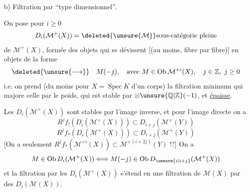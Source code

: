 b) Filtration par  ``type dimensionnel''.

On pose pour $i\geq0$
\[
D_i(\mathcal{M}^+(X))=
\deleted{\unsure{\mathcal{M}}}\text{sous-catégorie pleine}
\]
de $\mathcal{M}^+(X)$, formée des objets
qui se  dévissent [(au moins,
fibre par fibre)] en objets
de la forme
\[
\deleted{\unsure{\longrightarrow}}\quad
M(-j),\quad\text{avec }M\in\operatorname{Ob}\mathcal{M}^{+i}(X),\quad
j\in\mathbb{Z},\ j\geq0
\]
i.e. on prend (du moins pour $X=\operatorname{Spec}K$ d'un
corps) la filtration minimum qui
majore celle par le poids,  qui est
stable par $\otimes\unsure{\mathbb{Q}|\mathbb{Z}}(-1)$, et \uline{épaisse}.

Les $D_i(\mathcal{M}^+(X))$ sont stables par l'image inverse,
et pour l'image directe on a
\[
R^jf_!(D_i(\mathcal{M}^+(X)))\subset D_{i+j}(\mathcal{M}^+(Y))
\]
\[
R^jf_*(D_i(\mathcal{M}^+(X)))\subset D_{i+j}(\mathcal{M}^+(Y))
\]
[On a seulement
$R^jf_*(\mathcal{M}^{+i}(X))\subset \mathcal{M}^{+(i+2j)}(Y)$ !?]
On  a
\[
M\in\operatorname{Ob}D_i(\mathcal{M}^+(X))
\Longleftrightarrow
M(-j)\in\operatorname{Ob}D_{\unsure{i|i+j}}(\mathcal{M}^+(X))
\]
et la filtration  par les $D_i(\mathcal{M}^+(X))$ s'étend
en une filtration de $\mathcal{M}(X)$ par des $D_i(\mathcal{M}(X))$.
